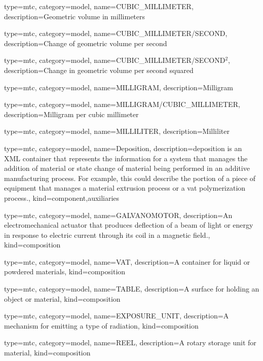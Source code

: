 {
  type=mtc,
  category=model,
  name={CUBIC\_MILLIMETER},
  description={Geometric volume in millimeters}
}


{
  type=mtc,
  category=model,
  name={CUBIC\_MILLIMETER/SECOND},
  description={Change of geometric volume per second}
}


{
  type=mtc,
  category=model,
  name={CUBIC\_MILLIMETER/SECOND$^2$},
  description={Change in geometric volume per second squared}
}


{
  type=mtc,
  category=model,
  name={MILLIGRAM},
  description={Milligram }
}


{
  type=mtc,
  category=model,
  name={MILLIGRAM/CUBIC\_MILLIMETER},
  description={Milligram per cubic millimeter  }
}


{
  type=mtc,
  category=model,
  name={MILLILITER},
  description={Milliliter  }
}


{
  type=mtc,
  category=model,
  name={Deposition},
  description={\gls{deposition} is an XML container that represents the information for a system that manages the addition of material or state change of material being performed in an additive manufacturing process.  For example, this could describe the portion of a piece of equipment that manages a material extrusion process or a vat polymerization process.},
  kind={component,auxiliaries}
}


{
  type=mtc,
  category=model,
  name={GALVANOMOTOR},
  description={An electromechanical actuator that produces deflection of a beam of light or energy in response to electric current through its coil in a magnetic field.},
  kind={composition}
}


{
  type=mtc,
  category=model,
  name={VAT},
  description={A container for liquid or powdered materials},
  kind={composition}
}


{
  type=mtc,
  category=model,
  name={TABLE},
  description={A surface for holding an object or material},
  kind={composition}
}


{
  type=mtc,
  category=model,
  name={EXPOSURE\_UNIT},
  description={A mechanism for emitting a type of radiation},
  kind={composition}
}


{
  type=mtc,
  category=model,
  name={REEL},
  description={A rotary storage unit for material},
  kind={composition}
}


